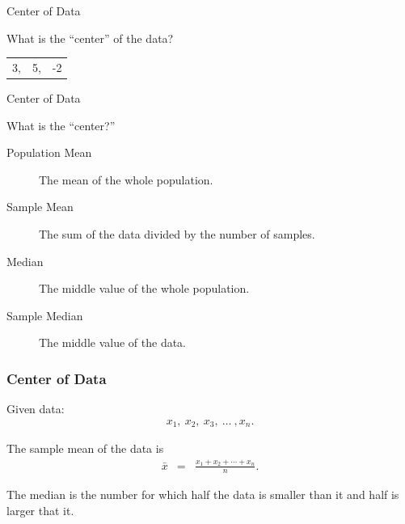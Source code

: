 \begin{frame}{Center of Data}

  What is the ``center'' of the data?

  \begin{tabular}{lll}
    3, & 5, & -2
  \end{tabular}

  
\end{frame}


\begin{frame}{Center of Data}

  What is the ``center?''

  \begin{description}
  \item[Population Mean] The mean of the whole population.
  \item[Sample Mean] The sum of the data divided by the number of
    samples.
  \item[Median] The middle value of the whole population.
  \item[Sample Median] The middle value of the data.
  \end{description}

  
\end{frame}



\begin{frame}
  \frametitle{Center of Data}

  Given data:
  \begin{eqnarray*}
    x_1, ~ x_2, ~ x_3, ~ \ldots ~,x_n.
  \end{eqnarray*}

  \begin{definition}
    The sample mean of the data is 
    \begin{eqnarray*}
      \bar{x} & = & \frac{x_1+x_2+\cdots+x_n}{n}.
    \end{eqnarray*}
  \end{definition}

  \begin{definition}
    The median is the number for which half the data is smaller than
    it and half is larger that it.
  \end{definition}
  

\end{frame}


